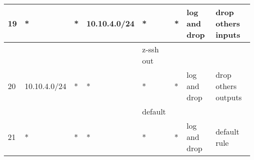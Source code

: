 \documentclass[a4paper, 11pt, oneside]{article}
\begin{document}
\begin{table}[H]
\begin{tabular}{|llllllll|}
  \multicolumn{1}{|l|}{19}          & \multicolumn{1}{l|}{*}               & \multicolumn{1}{l|}{*}           & \multicolumn{1}{l|}{10.10.4.0/24}         & \multicolumn{1}{l|}{*}           & \multicolumn{1}{l|}{*}                 & \multicolumn{1}{l|}{log and drop}            & drop others inputs  \\ \hline
                                    &                                      &                                  &                                           & {\color[HTML]{FE0000} z-ssh out} &                                        &                                      &                     \\ \hline
  \multicolumn{1}{|l|}{20}          & \multicolumn{1}{l|}{10.10.4.0/24}    & \multicolumn{1}{l|}{*}           & \multicolumn{1}{l|}{*}                    & \multicolumn{1}{l|}{*}           & \multicolumn{1}{l|}{*}                 & \multicolumn{1}{l|}{log and drop}            & drop others outputs \\ \hline
                                    &                                      &                                  &                                           & {\color[HTML]{FE0000} default}   &                                        &                                      &                     \\ \hline
  \multicolumn{1}{|l|}{21}          & \multicolumn{1}{l|}{*}               & \multicolumn{1}{l|}{*}           & \multicolumn{1}{l|}{*}                    & \multicolumn{1}{l|}{*}           & \multicolumn{1}{l|}{*}                 & \multicolumn{1}{l|}{log and drop}    & default rule        \\ \hline
  
  \end{tabular}
\end{table}

\end{document}
